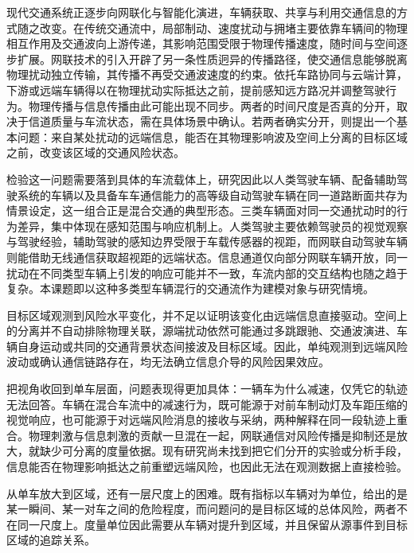 \documentclass[oneside,doctype=proposal,fontset=windows,times=true]{tongjithesis}
\begin{document}
\pagestyle{empty}

\MakeDocument


\tjformgap{18.72bp}%
%
\begin{tjformbody}
现代交通系统正逐步向网联化与智能化演进，车辆获取、共享与利用交通信息的方式随之改变。在传统交通流中，局部制动、速度扰动与拥堵主要依靠车辆间的物理相互作用及交通波向上游传递，其影响范围受限于物理传播速度，随时间与空间逐步扩展\cite{saberi2020}\cite{hamedmoghadam2021}。网联技术的引入开辟了另一条性质迥异的传播路径，使交通信息能够脱离物理扰动独立传输，其传播不再受交通波速度的约束。依托车路协同与云端计算，下游或远端车辆得以在物理扰动实际抵达之前，提前感知远方路况并调整驾驶行为。物理传播与信息传播由此可能出现不同步。两者的时间尺度是否真的分开，取决于信道质量与车流状态，需在具体场景中确认。若两者确实分开，则提出一个基本问题：来自某处扰动的远端信息，能否在其物理影响波及空间上分离的目标区域之前，改变该区域的交通风险状态。

检验这一问题需要落到具体的车流载体上，研究因此以人类驾驶车辆、配备辅助驾驶系统的车辆以及具备车车通信能力的高等级自动驾驶车辆在同一道路断面共存为情景设定，这一组合正是混合交通的典型形态。三类车辆面对同一交通扰动时的行为差异，集中体现在感知范围与响应机制上。人类驾驶主要依赖驾驶员的视觉观察与驾驶经验，辅助驾驶的感知边界受限于车载传感器的视距，而网联自动驾驶车辆则能借助无线通信获取超视距的远端状态。信息通道仅向部分网联车辆开放，同一扰动在不同类型车辆上引发的响应可能并不一致，车流内部的交互结构也随之趋于复杂。本课题即以这种多类型车辆混行的交通流作为建模对象与研究情境。

%
目标区域观测到风险水平变化，并不足以证明该变化由远端信息直接驱动。空间上的分离并不自动排除物理关联，源端扰动依然可能通过多跳跟驰、交通波演进、车辆自身运动或共同的交通背景状态间接波及目标区域\cite{duan2023}\cite{li2014}。因此，单纯观测到远端风险波动或确认通信链路存在，均无法确立信息介导的风险因果效应。

把视角收回到单车层面，问题表现得更加具体：一辆车为什么减速，仅凭它的轨迹无法回答。车辆在混合车流中的减速行为，既可能源于对前车制动灯及车距压缩的视觉响应，也可能源于对远端风险消息的接收与采纳\cite{wang2021}，两种解释在同一段轨迹上重合。物理刺激与信息刺激的贡献一旦混在一起，网联通信对风险传播是抑制还是放大，就缺少可分离的度量依据。现有研究尚未找到把它们分开的实验或分析手段，信息能否在物理影响抵达之前重塑远端风险，也因此无法在观测数据上直接检验。

从单车放大到区域，还有一层尺度上的困难。既有指标以车辆对为单位，给出的是某一瞬间、某一对车之间的危险程度，而问题问的是目标区域的总体风险，两者不在同一尺度上。度量单位因此需要从车辆对提升到区域，并且保留从源事件到目标区域的追踪关系\cite{minderhoud2001}\cite{tarko2018}\cite{arun2021}。


\end{tjformbody}
\end{document}
